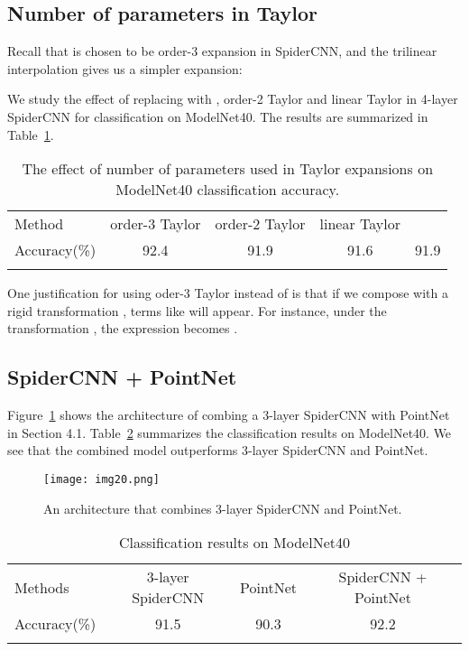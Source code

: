 \documentclass[runningheads]{llncs}
\begin{document}
\subsection{Number of parameters in Taylor}

Recall that  is chosen to be order-3 expansion in SpiderCNN, and the trilinear interpolation gives us a simpler expansion:

We study the effect of replacing  with , order-2 Taylor and linear Taylor in 4-layer SpiderCNN for classification on ModelNet40. The results are summarized in Table~\ref{table:Taylor}.

\setlength{\tabcolsep}{4pt}
\begin{table}
\begin{center}
\caption{The effect of number of parameters used in Taylor expansions on ModelNet40 classification accuracy.}
\label{table:Taylor}
\begin{tabular}{l|cccc}
\hline\noalign{\smallskip}
Method & order-3 Taylor & order-2 Taylor & linear Taylor & 
\\
\noalign{\smallskip}
\hline
\noalign{\smallskip}
Accuracy(\%) & 92.4 & 91.9 & 91.6 & 91.9
\\
\noalign{\smallskip}
\hline
\end{tabular}
\end{center}
\end{table}
\setlength{\tabcolsep}{1.4pt}

One justification for using oder-3 Taylor instead of  is that if we compose  with a rigid transformation , terms like  will appear. For instance, under the transformation , the expression  becomes .

\subsection{SpiderCNN + PointNet}

Figure~\ref{fig:pointnet} shows the architecture of combing a 3-layer SpiderCNN with PointNet in Section 4.1. Table~\ref{table:combine} summarizes the classification results on ModelNet40. We see that the combined model outperforms 3-layer SpiderCNN and PointNet.

\begin{figure}
\centering
\texttt{[image: img20.png]} 
\caption{
An architecture that combines 3-layer SpiderCNN and PointNet.
}
\label{fig:pointnet}
\end{figure}

\setlength{\tabcolsep}{4pt}
\begin{table}
\begin{center}
\caption{Classification results on ModelNet40 }
\label{table:combine}
\begin{tabular}{l|ccc}
\hline\noalign{\smallskip}
Methods & 3-layer SpiderCNN & PointNet & SpiderCNN + PointNet\\
\noalign{\smallskip}
\hline
\noalign{\smallskip}
 Accuracy(\%) & 91.5 & 90.3 & 92.2
\\
\noalign{\smallskip}
\hline
\end{tabular}
\end{center}
\end{table}
\setlength{\tabcolsep}{1.4pt}





\end{document}
